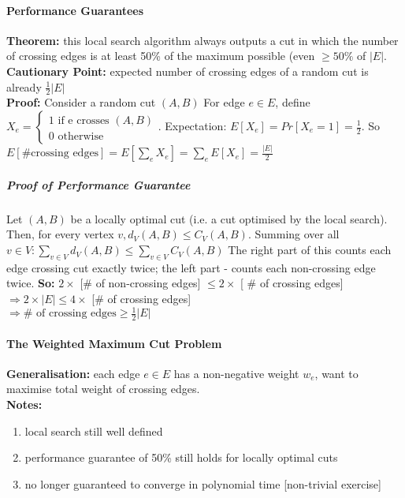 \documentclass{scrartcl}
\begin{document}
\paragraph{Performance Guarantees}
{\bf Theorem: } this local search algorithm always outputs a cut in which the
number of crossing edges is at least 50\% of the maximum possible (even $\geq
50\%$ of $|E|$.\\
{\bf Cautionary Point: } expected number of crossing edges of a random cut is
already $\frac12 |E|$\\
{\bf Proof: } Consider a random cut $(A, B)$ For edge $e \in E$, define $X_e =
\left\{ \begin{smallmatrix} 1 \text{ if e crosses } (A, B)\\ 0 \text{ otherwise
      }  \end{smallmatrix} \right.$. 
Expectation: $E[X_e] = Pr[X_e = 1] = \frac12$. 
So $E[\#\text{crossing edges}] = E[\sum \limits_e X_e] = \sum \limits_e E[X_e] =
\frac{|E|}2$

\subparagraph{Proof of Performance Guarantee}
Let $(A, B)$ be a locally optimal cut (i.e. a cut optimised by the local
search). Then, for every vertex $v, d_V(A, B) \leq C_V(A, B)$. 
Summing over all $v \in V: \sum \limits_{v \in V} d_V(A, B) \leq \sum
\limits_{v \in V} C_V (A, B)$
The right part of this counts each edge crossing cut exactly twice; the left
part - counts each non-crossing edge twice.
{\bf So: } $2 \times $ [\# of non-crossing edges] $\leq 2 \times$ [ \# of
crossing edges] \\
$\Rightarrow 2 \times |E| \leq 4 \times$ [\# of crossing edges]\\
$\Rightarrow \#\text{ of crossing edges} \geq \frac12 |E|$

\paragraph{The Weighted Maximum Cut Problem}

{\bf Generalisation: } each edge $e \in E$ has a non-negative weight $w_e$, want
to maximise total weight of crossing edges.\\
{\bf Notes: }
\begin{enumerate}
\item local search still well defined
\item performance guarantee of 50\% still holds for locally optimal cuts 
\item no longer guaranteed to converge in polynomial time [non-trivial exercise]  
\end{enumerate}
\end{document}
